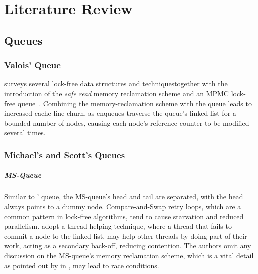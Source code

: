\chapter{Literature Review}

\section{Queues}
\subsection{Valois' Queue}

\citeauthor{valois1994queues} surveys several lock-free data structures and
techniques\textemdash together with the introduction of the \emph{safe read}
memory reclamation scheme and an MPMC lock-free
queue~\citep{valois1994queues,valois1995datastructures}.
Combining the memory-reclamation scheme with the queue leads to increased cache line
churn, as enqueues traverse the queue's linked list for a bounded number of
nodes, causing each node's reference counter to be modified several times. 


\subsection{Michael's and Scott's Queues}

\paragraph{MS-Queue}
Similar to \citeauthor{valois1994queues}' queue, the MS-queue's head and tail
are separated, with the head always points to a dummy node. Compare-and-Swap
retry loops, which are a common pattern in lock-free algorithms, tend to
cause starvation and reduced parallelism.
\citeauthor{michael1996simple} adopt a thread-helping technique, where a thread
that fails to commit a node to the linked list, may help other threads by doing
part of their work, acting as a secondary back-off, reducing contention. 
The authors omit any discussion on the MS-queue's memory reclamation scheme,
which is a vital detail as pointed out by \citeauthor{michael2004hazard}
in \citep{michael2004hazard}, may lead to race conditions. 

